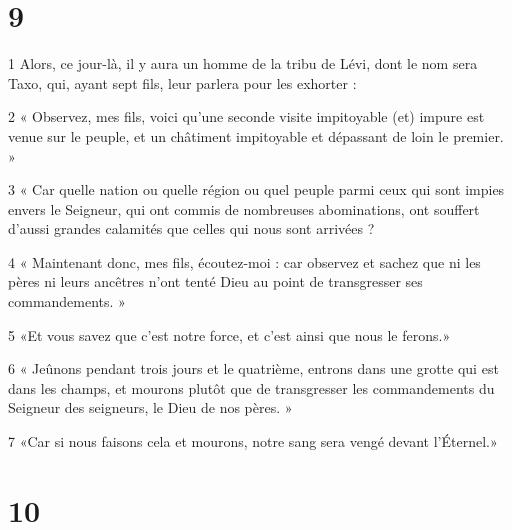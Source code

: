\chapter{9}

\par 1 Alors, ce jour-là, il y aura un homme de la tribu de Lévi, dont le nom sera Taxo, qui, ayant sept fils, leur parlera pour les exhorter :
\par 2 « Observez, mes fils, voici qu'une seconde visite impitoyable (et) impure est venue sur le peuple, et un châtiment impitoyable et dépassant de loin le premier. »
\par 3 « Car quelle nation ou quelle région ou quel peuple parmi ceux qui sont impies envers le Seigneur, qui ont commis de nombreuses abominations, ont souffert d'aussi grandes calamités que celles qui nous sont arrivées ?
\par 4 « Maintenant donc, mes fils, écoutez-moi : car observez et sachez que ni les pères ni leurs ancêtres n'ont tenté Dieu au point de transgresser ses commandements. »
\par 5 «Et vous savez que c'est notre force, et c'est ainsi que nous le ferons.»
\par 6 « Jeûnons pendant trois jours et le quatrième, entrons dans une grotte qui est dans les champs, et mourons plutôt que de transgresser les commandements du Seigneur des seigneurs, le Dieu de nos pères. »
\par 7 «Car si nous faisons cela et mourons, notre sang sera vengé devant l'Éternel.»

\chapter{10}

